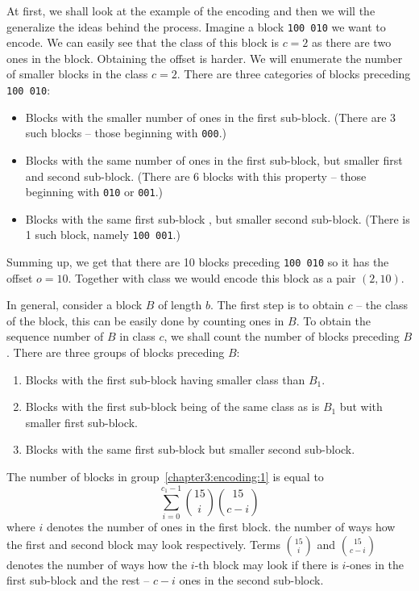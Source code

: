 At first, we shall look at the example of the encoding and then we will the generalize the ideas behind
the process. Imagine a block {\tt 100 010} we want to encode. We can easily see that the class of this
block is $c=2$ as there are two ones in the block. Obtaining the offset is harder. We will enumerate the
number of smaller blocks in the class $c=2$. There are three categories of blocks preceding {\tt 100 010}:

\begin{itemize}
    \item Blocks with the smaller number of ones in the first sub-block.
    (There are 3 such blocks -- those beginning with {\tt 000}.)
    \item Blocks with the same number of ones in the first sub-block, but smaller first and second sub-block.
    (There are 6 blocks with this property -- those beginning with {\tt 010} or {\tt 001}.)
    \item Blocks with the same first sub-block , but smaller second sub-block.
    (There is 1 such block, namely {\tt 100 001}.)
\end{itemize}

Summing up, we get that there are 10 blocks preceding {\tt 100 010} so it has the offset $o=10$. Together
with class we would encode this block as a pair $(2, 10)$. 

In general, consider a block $B$ of length $b$. The first step is to obtain $c$ -- the class of the block,
this can be easily done by counting ones in $B$. To obtain the sequence number of $B$ in class $c$, we shall
count the number of blocks preceding $B$. There are three groups of blocks preceding $B$:

\begin{enumerate}
    \item Blocks with the first sub-block having smaller class than $B_1$. \label{chapter3:encoding:1}
    \item Blocks with the first sub-block being of the same class as is $B_1$ but with smaller first sub-block. \label{chapter3:encoding:2}
    \item Blocks with the same first sub-block but smaller second sub-block. \label{chapter3:encoding:3}
\end{enumerate}

The number of blocks in group~\ref{chapter3:encoding:1} is equal to
$$\sum_{i=0}^{c_1-1} {15\choose i} {15\choose c-i}$$ where $i$ denotes the number of ones in the first
block. the number of ways how the first and second block may
look respectively. Terms ${15\choose i}$ and ${15\choose c-i}$ denotes the number of ways how the
$i$-th block may look if there is $i$-ones in the first sub-block and the rest -- $c-i$ ones in the
second sub-block.

